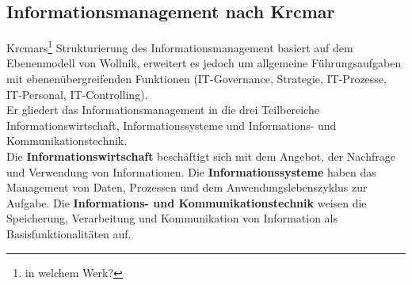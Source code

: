 \subsection{Informationsmanagement nach Krcmar}
Krcmars\footnote{in welchem Werk?} Strukturierung des Informationsmanagement basiert auf dem Ebenenmodell von Wollnik, erweitert es jedoch um allgemeine Führungsaufgaben mit ebenenübergreifenden Funktionen (IT-Governance, Strategie, IT-Prozesse, IT-Personal, IT-Controlling).\\

Er gliedert das Informationsmanagement in die drei Teilbereiche Informationswirtschaft, Informationssysteme und Informations- und Kommunikationstechnik.\\

Die \textbf{Informationswirtschaft} beschäftigt sich mit dem Angebot, der Nachfrage und Verwendung von Informationen.
Die \textbf{Informationssysteme} haben das Management von Daten, Prozessen und dem Anwendungslebenszyklus zur Aufgabe.
Die \textbf{Informations- und Kommunikationstechnik} weisen die Speicherung, Verarbeitung und Kommunikation von Information als Basisfunktionalitäten auf.
